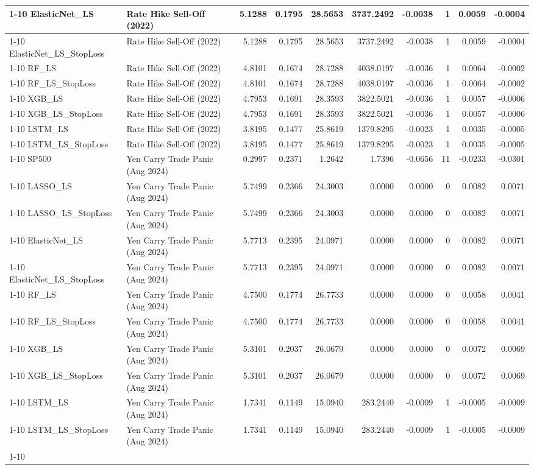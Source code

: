\begin{tabular}{llrrrrrrrr}
\cline{1-10}
ElasticNet\_LS & Rate Hike Sell-Off (2022) & 5.1288 & 0.1795 & 28.5653 & 3737.2492 & -0.0038 & 1 & 0.0059 & -0.0004 \\
\cline{1-10}
ElasticNet\_LS\_StopLoss & Rate Hike Sell-Off (2022) & 5.1288 & 0.1795 & 28.5653 & 3737.2492 & -0.0038 & 1 & 0.0059 & -0.0004 \\
\cline{1-10}
RF\_LS & Rate Hike Sell-Off (2022) & 4.8101 & 0.1674 & 28.7288 & 4038.0197 & -0.0036 & 1 & 0.0064 & -0.0002 \\
\cline{1-10}
RF\_LS\_StopLoss & Rate Hike Sell-Off (2022) & 4.8101 & 0.1674 & 28.7288 & 4038.0197 & -0.0036 & 1 & 0.0064 & -0.0002 \\
\cline{1-10}
XGB\_LS & Rate Hike Sell-Off (2022) & 4.7953 & 0.1691 & 28.3593 & 3822.5021 & -0.0036 & 1 & 0.0057 & -0.0006 \\
\cline{1-10}
XGB\_LS\_StopLoss & Rate Hike Sell-Off (2022) & 4.7953 & 0.1691 & 28.3593 & 3822.5021 & -0.0036 & 1 & 0.0057 & -0.0006 \\
\cline{1-10}
LSTM\_LS & Rate Hike Sell-Off (2022) & 3.8195 & 0.1477 & 25.8619 & 1379.8295 & -0.0023 & 1 & 0.0035 & -0.0005 \\
\cline{1-10}
LSTM\_LS\_StopLoss & Rate Hike Sell-Off (2022) & 3.8195 & 0.1477 & 25.8619 & 1379.8295 & -0.0023 & 1 & 0.0035 & -0.0005 \\
\cline{1-10}
SP500 & Yen Carry Trade Panic (Aug 2024) & 0.2997 & 0.2371 & 1.2642 & 1.7396 & -0.0656 & 11 & -0.0233 & -0.0301 \\
\cline{1-10}
LASSO\_LS & Yen Carry Trade Panic (Aug 2024) & 5.7499 & 0.2366 & 24.3003 & 0.0000 & 0.0000 & 0 & 0.0082 & 0.0071 \\
\cline{1-10}
LASSO\_LS\_StopLoss & Yen Carry Trade Panic (Aug 2024) & 5.7499 & 0.2366 & 24.3003 & 0.0000 & 0.0000 & 0 & 0.0082 & 0.0071 \\
\cline{1-10}
ElasticNet\_LS & Yen Carry Trade Panic (Aug 2024) & 5.7713 & 0.2395 & 24.0971 & 0.0000 & 0.0000 & 0 & 0.0082 & 0.0071 \\
\cline{1-10}
ElasticNet\_LS\_StopLoss & Yen Carry Trade Panic (Aug 2024) & 5.7713 & 0.2395 & 24.0971 & 0.0000 & 0.0000 & 0 & 0.0082 & 0.0071 \\
\cline{1-10}
RF\_LS & Yen Carry Trade Panic (Aug 2024) & 4.7500 & 0.1774 & 26.7733 & 0.0000 & 0.0000 & 0 & 0.0058 & 0.0041 \\
\cline{1-10}
RF\_LS\_StopLoss & Yen Carry Trade Panic (Aug 2024) & 4.7500 & 0.1774 & 26.7733 & 0.0000 & 0.0000 & 0 & 0.0058 & 0.0041 \\
\cline{1-10}
XGB\_LS & Yen Carry Trade Panic (Aug 2024) & 5.3101 & 0.2037 & 26.0679 & 0.0000 & 0.0000 & 0 & 0.0072 & 0.0069 \\
\cline{1-10}
XGB\_LS\_StopLoss & Yen Carry Trade Panic (Aug 2024) & 5.3101 & 0.2037 & 26.0679 & 0.0000 & 0.0000 & 0 & 0.0072 & 0.0069 \\
\cline{1-10}
LSTM\_LS & Yen Carry Trade Panic (Aug 2024) & 1.7341 & 0.1149 & 15.0940 & 283.2440 & -0.0009 & 1 & -0.0005 & -0.0009 \\
\cline{1-10}
LSTM\_LS\_StopLoss & Yen Carry Trade Panic (Aug 2024) & 1.7341 & 0.1149 & 15.0940 & 283.2440 & -0.0009 & 1 & -0.0005 & -0.0009 \\
\cline{1-10}
\bottomrule
\end{tabular}
